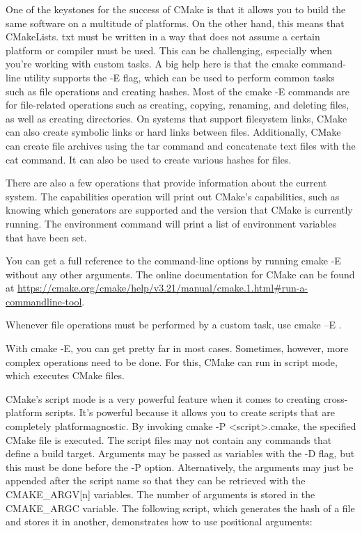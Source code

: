 
One of the keystones for the success of CMake is that it allows you to build the same software on a multitude of platforms. On the other hand, this means that CMakeLists. txt must be written in a way that does not assume a certain platform or compiler must be used. This can be challenging, especially when you're working with custom tasks. A big help here is that the cmake command-line utility supports the -E flag, which can be used to perform common tasks such as file operations and creating hashes. Most of the cmake -E commands are for file-related operations such as creating, copying, renaming, and deleting files, as well as creating directories. On systems that support filesystem links, CMake can also create symbolic links or hard links between files. Additionally, CMake can create file archives using the tar command and concatenate text files with the cat command. It can also be used to create various hashes for files.

There are also a few operations that provide information about the current system. The capabilities operation will print out CMake's capabilities, such as knowing which generators are supported and the version that CMake is currently running. The environment command will print a list of environment variables that have been set.

You can get a full reference to the command-line options by running cmake -E without any other arguments. The online documentation for CMake can be found at \url{https://cmake.org/cmake/help/v3.21/manual/cmake.1.html#run-a-commandline-tool}.

\begin{tcolorbox}[colback=blue!5!white,colframe=blue!75!black,title=Platform-Agnostic File Operations]
Whenever file operations must be performed by a custom task, use cmake –E .
\end{tcolorbox}

With cmake -E, you can get pretty far in most cases. Sometimes, however, more complex operations need to be done. For this, CMake can run in script mode, which executes CMake files.


CMake's script mode is a very powerful feature when it comes to creating cross-platform scripts. It's powerful because it allows you to create scripts that are completely platformagnostic. By invoking cmake -P <script>.cmake, the specified CMake file is executed. The script files may not contain any commands that define a build target. Arguments may be passed as variables with the -D flag, but this must be done before the -P option. Alternatively, the arguments may just be appended after the script name so that they can be retrieved with the CMAKE\_ARGV[n] variables. The number of arguments is stored in the CMAKE\_ARGC variable. The following script, which generates the hash of a file and stores it in another, demonstrates how to use positional arguments: 

